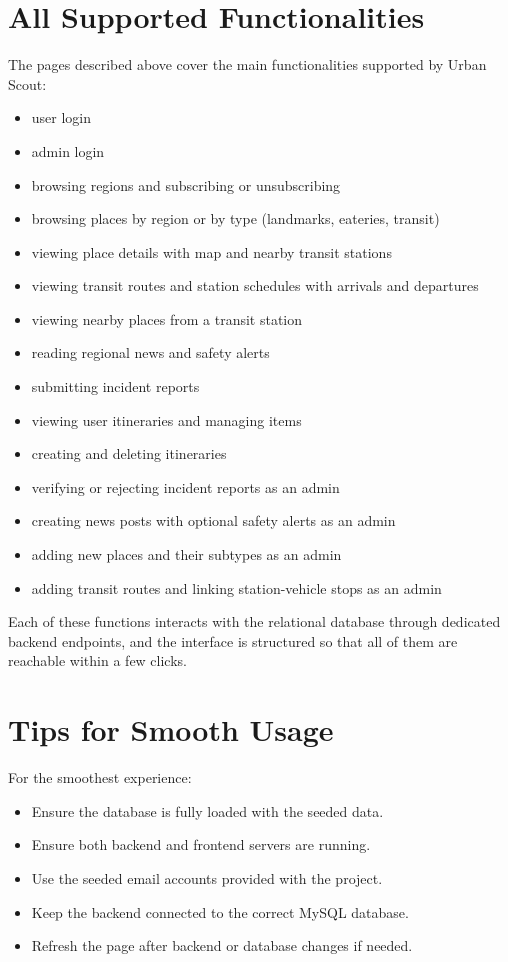 \documentclass[11pt,letterpaper]{article}
\begin{document}
\section{All Supported Functionalities}

The pages described above cover the main functionalities supported by Urban Scout:
\begin{itemize}
    \item user login
    \item admin login
    \item browsing regions and subscribing or unsubscribing
    \item browsing places by region or by type (landmarks, eateries, transit)
    \item viewing place details with map and nearby transit stations
    \item viewing transit routes and station schedules with arrivals and departures
    \item viewing nearby places from a transit station
    \item reading regional news and safety alerts
    \item submitting incident reports
    \item viewing user itineraries and managing items
    \item creating and deleting itineraries
    \item verifying or rejecting incident reports as an admin
    \item creating news posts with optional safety alerts as an admin
    \item adding new places and their subtypes as an admin
    \item adding transit routes and linking station-vehicle stops as an admin
\end{itemize}

Each of these functions interacts with the relational database through dedicated backend endpoints, and the interface is structured so that all of them are reachable within a few clicks.

\section{Tips for Smooth Usage}

For the smoothest experience:
\begin{itemize}
    \item Ensure the database is fully loaded with the seeded data.
    \item Ensure both backend and frontend servers are running.
    \item Use the seeded email accounts provided with the project.
    \item Keep the backend connected to the correct MySQL database.
    \item Refresh the page after backend or database changes if needed.
\end{itemize}
\end{document}
